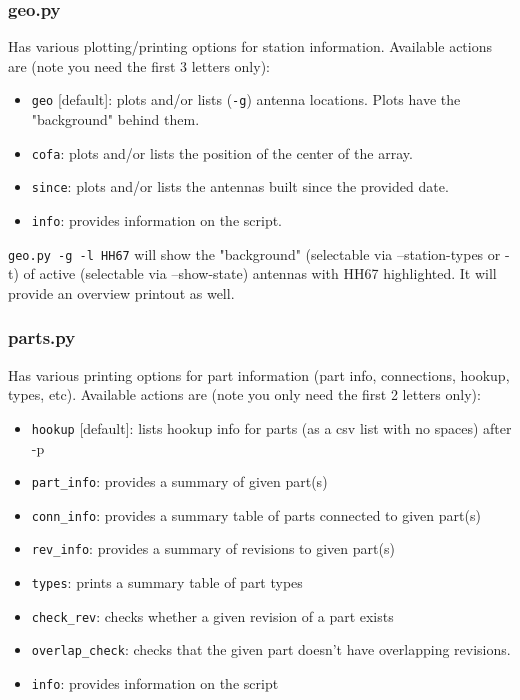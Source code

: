 \documentclass{article}
\begin{document}
\subsubsection{geo.py}
Has various plotting/printing options for station information.  Available actions are (note you need the first 3 letters only):

\begin{itemize}
\item {\tt geo} [default]:  plots and/or lists ({\tt -g}) antenna locations.  Plots have the "background" behind them.
\item {\tt cofa}:  plots and/or lists the position of the center of the array.
\item {\tt since}:  plots and/or lists the antennas built since the provided date.
\item {\tt info}:  provides information on the script.
\end{itemize}

{\tt geo.py -g -l HH67} will show the "background" (selectable via --station-types or -t) of active (selectable via --show-state) antennas with HH67 highlighted.  It will provide an overview printout as well.

\subsubsection{parts.py}
Has various printing options for part information (part info, connections, hookup, types, etc).  Available actions are (note you only need the first 2 letters only):

\begin{itemize}
\item {\tt hookup} [default]:  lists hookup info for parts (as a csv list with no spaces) after -p
\item {\tt part\_info}:   provides a summary of given part(s)
\item {\tt conn\_info}:   provides a summary table of parts connected to given part(s)
\item {\tt rev\_info}:  provides a summary of revisions to given part(s)
\item {\tt types}:  prints a summary table of part types
\item {\tt check\_rev}:  checks whether a given revision of a part exists
\item {\tt overlap\_check}:  checks that the given part doesn't have overlapping revisions.
\item {\tt info}:   provides information on the script
\end{itemize}
\end{document}

